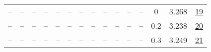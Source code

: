 \begin{table}[H]
\begin{tabular}{ccccccccccccccc}
-- & -- & -- & -- & -- & -- & -- & -- & -- & -- & -- & -- & 0 & 3.268 & \href{https://wandb.ai/stanford-mercury/optimizer-scaling/runs/sweep-300m-6B-soapebf0b4dlr0.008-wd0-minlr0-warmup1000-b10.95-b2-f94927}{19} \\
-- & -- & -- & -- & -- & -- & -- & -- & -- & -- & -- & -- & 0.2 & 3.238 & \href{https://wandb.ai/stanford-mercury/optimizer-scaling/runs/sweep-300m-6B-soapecd3057lr0.008-wd0.2-minlr0-warmup1000-b10.95--6c5d2b}{20} \\
-- & -- & -- & -- & -- & -- & -- & -- & -- & -- & -- & -- & 0.3 & 3.249 & \href{https://wandb.ai/stanford-mercury/optimizer-scaling/runs/sweep-300m-6B-soape011acelr0.008-wd0.3-minlr0-warmup1000-b10.95--3fa518}{21} \\
\bottomrule
\end{tabular}
\end{table}

